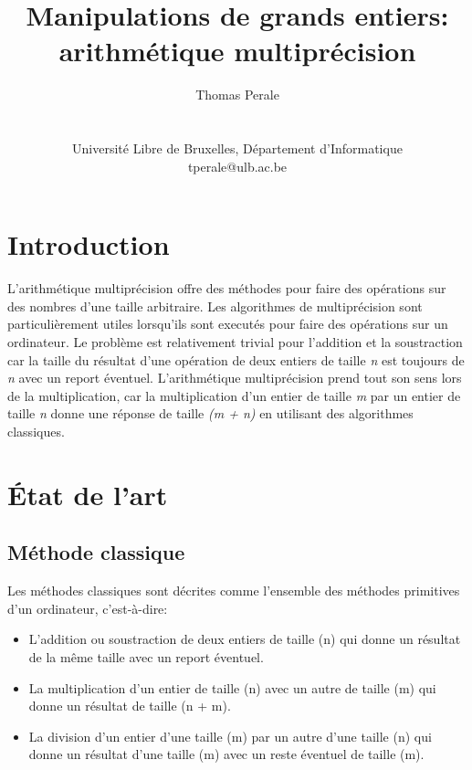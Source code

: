 \documentclass[letterpaper]{article}
\title{Manipulations de grands entiers: arithmétique multiprécision}
\author{Thomas Perale\\
    \mbox{}\\\\
    Université Libre de Bruxelles, Département d'Informatique\\
    tperale@ulb.ac.be\\
}
\begin{document}
\maketitle

\begin{abstract}

\end{abstract}

\section{Introduction}

L'arithmétique multiprécision offre des méthodes pour faire des opérations sur
des nombres d'une taille arbitraire.
Les algorithmes de multiprécision sont particulièrement utiles lorsqu'ils sont
executés pour faire des opérations sur un ordinateur.
Le problème est relativement trivial pour l'addition et la soustraction car
la taille du résultat d'une opération de deux entiers de taille \emph{n} est
toujours de \emph{n} avec un report éventuel.
L'arithmétique multiprécision prend tout son sens lors de la multiplication,
car la multiplication d'un entier de taille \emph{m} par un entier de taille
\emph{n} donne une réponse de taille \emph{(m + n)} en utilisant des
algorithmes classiques\cite{knuth1997aocp}.

\section{État de l'art}

\subsection{Méthode classique}

Les méthodes classiques sont décrites comme l'ensemble des méthodes primitives
d'un ordinateur\cite{knuth1997aocp}, c'est-à-dire:

\begin{itemize}
    \item L'addition ou soustraction de deux entiers de taille (n) qui donne
        un résultat de la même taille avec un report éventuel.
    \item La multiplication d'un entier de taille (n) avec un autre de taille
        (m) qui donne un résultat de taille (n + m).
    \item La division d'un entier d'une taille (m) par un autre d'une taille
        (n) qui donne un résultat d'une taille (m) avec un reste éventuel de
        taille (m).
\end{itemize}
\end{document}
